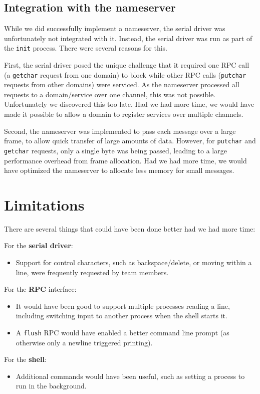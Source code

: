 \subsection{Integration with the nameserver}
\label{shell-integration-ns}

While we did successfully implement a nameserver, the serial driver was unfortunately not integrated with it.
Instead, the serial driver was run as part of the \verb|init| process.
There were several reasons for this.

First, the serial driver posed the unique challenge that it required one RPC call (a \verb|getchar| request from one domain) to block while other RPC calls (\verb|putchar| requests from other domains) were serviced.
As the nameserver processed all requests to a domain/service over one channel, this was not possible.
Unfortunately we discovered this too late.
Had we had more time, we would have made it possible to allow a domain to register services over multiple channels.

Second, the nameserver was implemented to pass each message over a large frame, to allow quick transfer of large amounts of data.
However, for \verb|putchar| and \verb|getchar| requests, only a single byte was being passed, leading to a large performance overhead from frame allocation.
Had we had more time, we would have optimized the nameserver to allocate less memory for small messages.


\section{Limitations}

There are several things that could have been done better had we had more time:

For the \textbf{serial driver}:
\begin{itemize}

    \item
        Support for control characters, such as backspace/delete, or moving within a line, were frequently requested by team members.

\end{itemize}

For the \textbf{RPC} interface:
\begin{itemize}

    \item
        It would have been good to support multiple processes reading a line, including switching input to another process when the shell starts it.

    \item
        A \verb|flush| RPC would have enabled a better command line prompt (as otherwise only a newline triggered printing).

\end{itemize}

For the \textbf{shell}:
\begin{itemize}

    \item
        Additional commands would have been useful, such as setting a process to run in the background.

\end{itemize}

